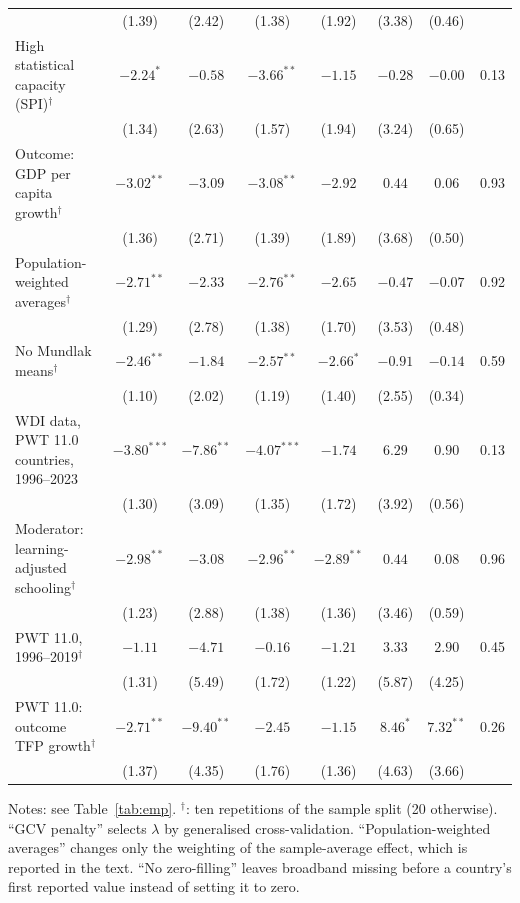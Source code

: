 \documentclass[pdflatex,sn-basic]{sn-jnl}%
\theoremstyle{thmstyleone}
\theoremstyle{thmstyletwo}
\renewenvironment{table}[1][]{\begin{tableorg}[#1]\centering\tablebodyfont}{\end{tableorg}}
\begin{document}
\begin{appendices}
\begin{table}[!p]
{\begin{threeparttable}
\begin{tabular}{lccccccc}
 & (1.39) & (2.42) & (1.38) & (1.92) & (3.38) & (0.46) & \\
\quad High statistical capacity (SPI)$^{\dagger}$ & $-2.24^{*}$ & $-0.58$ & $-3.66^{**}$ & $-1.15$ & $-0.28$ & $-0.00$ & 0.13\\
 & (1.34) & (2.63) & (1.57) & (1.94) & (3.24) & (0.65) & \\
\quad Outcome: GDP per capita growth$^{\dagger}$ & $-3.02^{**}$ & $-3.09$ & $-3.08^{**}$ & $-2.92$ & $0.44$ & $0.06$ & 0.93\\
 & (1.36) & (2.71) & (1.39) & (1.89) & (3.68) & (0.50) & \\
\quad Population-weighted averages$^{\dagger}$ & $-2.71^{**}$ & $-2.33$ & $-2.76^{**}$ & $-2.65$ & $-0.47$ & $-0.07$ & 0.92\\
 & (1.29) & (2.78) & (1.38) & (1.70) & (3.53) & (0.48) & \\
\quad No Mundlak means$^{\dagger}$ & $-2.46^{**}$ & $-1.84$ & $-2.57^{**}$ & $-2.66^{*}$ & $-0.91$ & $-0.14$ & 0.59\\
 & (1.10) & (2.02) & (1.19) & (1.40) & (2.55) & (0.34) & \\
\quad WDI data, PWT 11.0 countries, 1996--2023 & $-3.80^{***}$ & $-7.86^{**}$ & $-4.07^{***}$ & $-1.74$ & $6.29$ & $0.90$ & 0.13\\
 & (1.30) & (3.09) & (1.35) & (1.72) & (3.92) & (0.56) & \\
\quad Moderator: learning-adjusted schooling$^{\dagger}$ & $-2.98^{**}$ & $-3.08$ & $-2.96^{**}$ & $-2.89^{**}$ & $0.44$ & $0.08$ & 0.96\\
 & (1.23) & (2.88) & (1.38) & (1.36) & (3.46) & (0.59) & \\
\quad PWT 11.0, 1996--2019$^{\dagger}$ & $-1.11$ & $-4.71$ & $-0.16$ & $-1.21$ & $3.33$ & $2.90$ & 0.45\\
 & (1.31) & (5.49) & (1.72) & (1.22) & (5.87) & (4.25) & \\
\quad PWT 11.0: outcome TFP growth$^{\dagger}$ & $-2.71^{**}$ & $-9.40^{**}$ & $-2.45$ & $-1.15$ & $8.46^{*}$ & $7.32^{**}$ & 0.26\\
 & (1.37) & (4.35) & (1.76) & (1.36) & (4.63) & (3.66) & \\
\bottomrule
\end{tabular}
\begin{tablenotes}\scriptsize
\item Notes: see Table~\ref{tab:emp}. $^{\dagger}$: ten repetitions of the sample split (20 otherwise). ``GCV penalty'' selects $\lambda$ by generalised cross-validation. ``Population-weighted averages'' changes only the weighting of the sample-average effect, which is reported in the text. ``No zero-filling'' leaves broadband missing before a country's first reported value instead of setting it to zero.
\end{tablenotes}
\end{threeparttable}}
\end{table}


\end{appendices}
\end{document}
